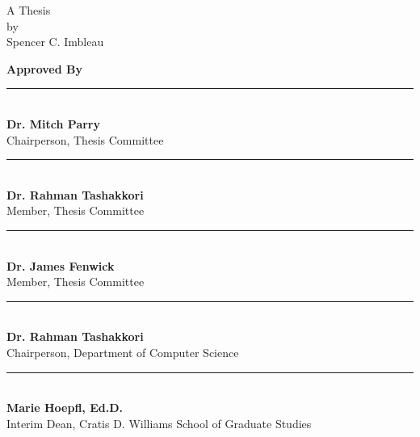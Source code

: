 \vfill
\begin{center}
\title{\Large\thesistitle}
\vfill
A Thesis\\
by\\
Spencer C. Imbleau\\
\date{\today}
\end{center}

\vfill

\begin{flushleft}
\textbf{Approved By}\\
\bigskip
\bigskip


\rule{3in}{.1pt}\\
\textbf{Dr. Mitch Parry}\\
Chairperson, Thesis Committee\\
\bigskip
\bigskip

\rule{3in}{.1pt}\\
\textbf{Dr. Rahman Tashakkori}\\
Member, Thesis Committee\\
\bigskip
\bigskip

\rule{3in}{.1pt}\\
\textbf{Dr. James Fenwick}\\
Member, Thesis Committee\\
\bigskip
\bigskip

\rule{3in}{.1pt}\\
\textbf{Dr. Rahman Tashakkori}\\
Chairperson, Department of Computer Science\\
\bigskip
\bigskip

\rule{3in}{.1pt}\\
\textbf{Marie Hoepfl, Ed.D.}\\
Interim Dean, Cratis D. Williams School of Graduate Studies
\end{flushleft}